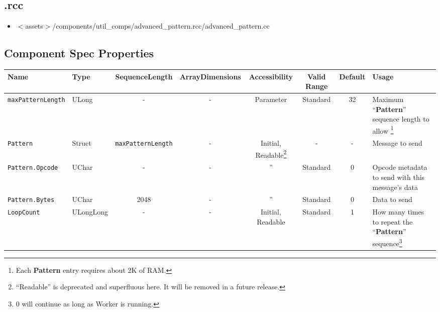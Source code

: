 \subsection*{\comp.rcc}
\begin{itemize}
	\item $<$assets$>$/components/util\_comps/advanced\_pattern.rcc/advanced\_pattern.cc
\end{itemize}

\begin{landscape}
	\section*{Component Spec Properties}
	\begin{scriptsize}
		\begin{minipage}{\textwidth}
			\renewcommand*\footnoterule{} %
			\renewcommand{\thempfootnote}{\arabic{mpfootnote}} %
			\begin{tabular}{|p{3cm}|p{1.5cm}|c|c|c|c|c|p{7cm}|}
				\hline
				\rowcolor{blue}
				Name &
				Type &
				SequenceLength &
				ArrayDimensions &
				Accessibility &
				Valid Range &
				Default &
				Usage \\
				\hline
				\verb+maxPatternLength+ &
				ULong &
				- &
				- &
				Parameter &
				Standard &
				32 &
				Maximum ``\textbf{Pattern}'' sequence length to allow \footnote{Each \textbf{Pattern} entry requires about 2K of RAM.} \\
				\hline
				\verb+Pattern+ &
				Struct &
				\verb+maxPatternLength+ &
				- &
				Initial, Readable\footnote{``Readable'' is deprecated and superfluous here. It will be removed in a future release.}\setcounter{fnreadable}{\thempfootnote} &
				- &
				- &
				Message to send \\
				\hline
				\verb+Pattern.Opcode+ &
				UChar &
				- &
				- &
				'' &
				Standard &
				0 &
				Opcode metadata to send with this message's data \\
				\hline
				\verb+Pattern.Bytes+ &
				UChar &
				2048 &
				- &
				'' &
				Standard &
				0 &
				Data to send \\
				\hline
				\verb+LoopCount+ &
				ULongLong &
				- &
				- &
				Initial, Readable\footnotemark[\thefnreadable] &
				Standard &
				1 &
				How many times to repeat the ``\textbf{Pattern}'' sequence\footnote{0 will continue as long as Worker is running.} \\
				\hline

\end{tabular}
\end{minipage}
\end{scriptsize}
\end{landscape}
